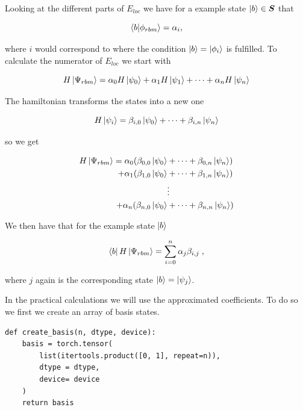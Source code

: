 Looking at the different parts of $E_{loc}$ we have for a example state $\ket{b} \in \boldsymbol{S}$ that

\begin{equation}
  \braket{b}{\phi_{rbm}} = \alpha_i ,
\end{equation}

where $i$ would correspond to where the condition $\ket{b} = \ket{\phi_i}$ is fulfilled. To calculate the numerator of $E_{loc}$ we start with

\begin{equation}
  H\ket{\Psi_{rbm}} =  \alpha_0H\ket{\psi_0} + \alpha_1H\ket{\psi_1} + \dots + \alpha_nH\ket{\psi_n}
\end{equation}

The hamiltonian transforms the states into a new one

\begin{equation}
  H\ket{\psi_i} = \beta_{i,0}\ket{\psi_0} + \dots + \beta_{i,n}\ket{\psi_n}
\end{equation}

so we get

\begin{align}
  H\ket{\Psi_{rbm}} = \alpha_0  ( \beta_{0,0}\ket{\psi_0} &+ \dots + \beta_{0,n}\ket{\psi_n}  ) \\
 + \alpha_1  ( \beta_{1,0}\ket{\psi_0} &+ \dots + \beta_{1,n}\ket{\psi_n}  ) \\
&\vdots \\
+ \alpha_n  ( \beta_{n,0}\ket{\psi_0} &+ \dots + \beta_{n,n}\ket{\psi_n}  ) 
\end{align}

We then have that for the example state $\ket{b}$

\begin{equation}
  \bra{b}H\ket{\Psi_{rbm}} = \sum_{i=0}^n \alpha_j\beta_{i,j} \; ,
\end{equation}

where $j$ again is the corresponding state $\ket{b} = \ket{\psi_j}$.

In the practical calculations we will use the approximated coefficients. To do so we first we create an array of basis states.

\begin{verbatim} 
def create_basis(n, dtype, device):
    basis = torch.tensor(
        list(itertools.product([0, 1], repeat=n)),
        dtype = dtype,
        device= device
    )
    return basis
\end{verbatim}

